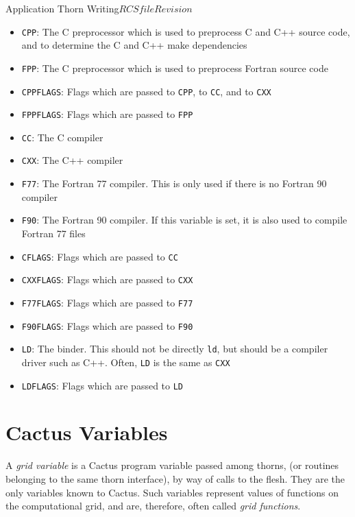 \begin{cactuspart}{Application Thorn Writing}{$RCSfile$}{$Revision$}
\begin{itemize}
\item \texttt{CPP}: The C preprocessor which is used to preprocess C
  and C++ source code, and to determine the C and C++ make
  dependencies
\item \texttt{FPP}: The C preprocessor which is used to preprocess
  Fortran source code
\item \texttt{CPPFLAGS}: Flags which are passed to \texttt{CPP}, to
  \texttt{CC}, and to \texttt{CXX}
\item \texttt{FPPFLAGS}: Flags which are passed to \texttt{FPP}
\item \texttt{CC}: The C compiler
\item \texttt{CXX}: The C++ compiler
\item \texttt{F77}: The Fortran 77 compiler.  This is only used if
  there is no Fortran 90 compiler
\item \texttt{F90}: The Fortran 90 compiler.  If this variable is
  set, it is also used to compile Fortran 77 files
\item \texttt{CFLAGS}: Flags which are passed to \texttt{CC}
\item \texttt{CXXFLAGS}: Flags which are passed to \texttt{CXX}
\item \texttt{F77FLAGS}: Flags which are passed to \texttt{F77}
\item \texttt{F90FLAGS}: Flags which are passed to \texttt{F90}
\item \texttt{LD}: The binder.  This should not be directly
  \texttt{ld}, but should be a compiler driver such as C++.
  Often, \texttt{LD} is the same as \texttt{CXX}
\item \texttt{LDFLAGS}: Flags which are passed to \texttt{LD}
\end{itemize}


\chapter{Cactus Variables}
\label{chap:cactus_variables}

A \textit{grid variable} is a Cactus program variable passed among thorns,
(or routines belonging to the same thorn interface),
by way of calls to the flesh.
They are the only variables known to Cactus.
Such variables represent values of functions on the computational grid,
and are, therefore, often called \textit{grid functions}.


\end{cactuspart}
